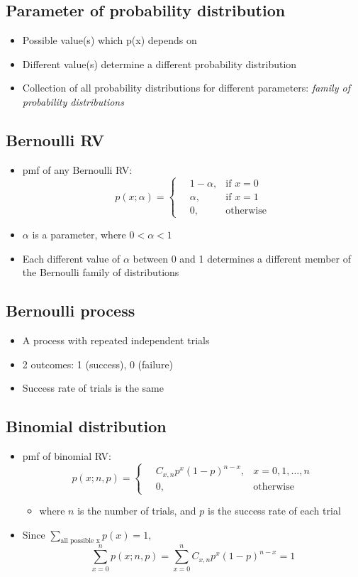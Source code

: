 \documentclass[a4paper]{article}
\begin{document}
\subsection{Parameter of probability distribution}
\begin{itemize}
    \item Possible value(s) which p(x) depends on
    \item Different value(s) determine a different probability distribution
    \item Collection of all probability distributions for different parameters: \textit{family of probability distributions}
\end{itemize}
\subsection{Bernoulli RV}
\begin{itemize}
    \item pmf of any Bernoulli RV:
    $$p(x; \alpha) = \begin{cases}
    \quad 1-\alpha,&\mbox{if }x = 0\\
    \quad \alpha,&\mbox{if }x = 1\\
    \quad 0, &\mbox{otherwise}
    \end{cases}
    $$
    \item $\alpha$ is a parameter, where $0<\alpha<1$
    \item Each different value of $\alpha$ between 0 and 1 determines a different member of the Bernoulli family of distributions
\end{itemize}
\subsection{Bernoulli process}
\begin{itemize}
    \item A process with repeated independent trials
    \item 2 outcomes: 1 (success), 0 (failure)
    \item Success rate of trials is the same
\end{itemize}
\subsection{Binomial distribution}
\begin{itemize}
    \item pmf of binomial RV:
    $$p(x;n,p) = \begin{cases}
    \quad C_{x, n}p^{x}(1-p)^{n-x},&\mbox{}x = 0, 1, \ldots, n\\
    \quad 0, &\mbox{otherwise}
    \end{cases}
    $$
    \begin{itemize}[label=$\circ$]
        \item where $n$ is the number of trials, and $p$ is the success rate of each trial
    \end{itemize}
    \item Since $\sum_{\text{all possible x}}p(x) = 1$, 
    $$\sum_{x = 0}^{n}p(x;n,p) = \sum_{x = 0}^{n}C_{x, n}p^{x}(1-p)^{n-x} = 1$$
\end{itemize}
\end{document}
